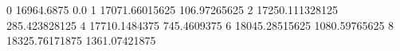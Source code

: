 0 16964.6875 0.0
1 17071.66015625 106.97265625
2 17250.111328125 285.423828125
4 17710.1484375 745.4609375
6 18045.28515625 1080.59765625
8 18325.76171875 1361.07421875
